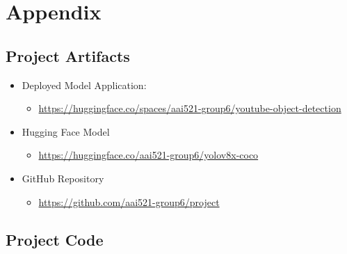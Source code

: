 \documentclass[10pt]{extarticle}
\begin{document}
\newpage

\printbibliography

\newpage


\section{Appendix}

\subsection{Project Artifacts}

\begin{itemize}

    \item Deployed Model Application:
    \begin{itemize}
        \item \url{https://huggingface.co/spaces/aai521-group6/youtube-object-detection}
    \end{itemize}

    \item Hugging Face Model
    \begin{itemize}
        \item \url{https://huggingface.co/aai521-group6/yolov8x-coco}
    \end{itemize}

    \item GitHub Repository
    \begin{itemize}
        \item \url{https://github.com/aai521-group6/project}
    \end{itemize}
\end{itemize}

\subsection{Project Code}

\newpage

\clearpage

\end{document}
